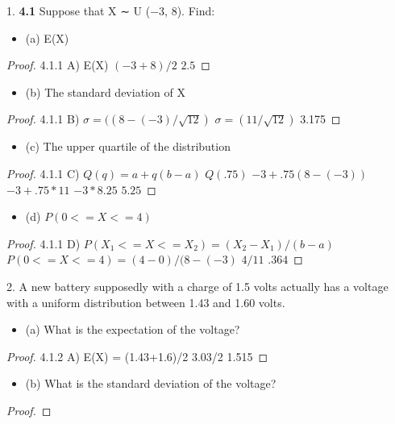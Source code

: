 \documentclass{article}
\begin{document}
1.
\textbf{4.1} 
Suppose that X ∼ U (−3, 8). Find:
    \begin{itemize}
        \begin{itemize}
            \item (a) E(X)
        \end{itemize}
    \end{itemize}
\begin{enumerate}
    \begin{proof}
    4.1.1 A)
E(X)
$(-3+8)/2$
$2.5$
    \end{proof}
        \begin{itemize}
            \item (b) The standard deviation of X
        \end{itemize}
    \begin{proof}
    4.1.1 B)
$\sigma = ((8-(-3)/\sqrt{12})$
$\sigma = (11/\sqrt{12})$
3.175
    \end{proof}
        \begin{itemize}
            \item (c) The upper quartile of the distribution
        \end{itemize}
    \begin{proof}
    4.1.1 C)
$Q(q)=a+q(b-a)$
$Q(.75)$
$-3+.75(8-(-3))$
$-3+.75*11$
$-3*8.25$
$5.25$    
\end{proof}
        \begin{itemize}
            \item (d) $P(0<=X<=4)$
        \end{itemize}
    \begin{proof}
    4.1.1 D)
$P(X_{1}<=X<=X_{2}) = (X_{2}-X_{1})/(b-a)$
$P(0<=X<=4) = (4-0)/(8-(-3)$
$4/11$
$.364$
    \end{proof}
2.
 A new battery supposedly with a charge of 1.5 volts actually has a voltage with a uniform distribution between 1.43 and 1.60 volts.
        \begin{itemize}
            \item (a) What is the expectation of the voltage?
        \end{itemize}
    \begin{proof}
4.1.2 A) 
E(X) = (1.43+1.6)/2
3.03/2
1.515
    \end{proof}
        \begin{itemize}
            \item  (b) What is the standard deviation of the voltage?
        \end{itemize}
\begin{proof}

\end{proof}
\end{enumerate}
\end{document}
